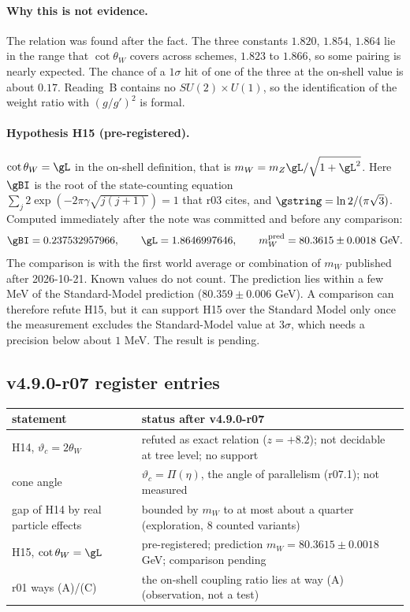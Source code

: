\paragraph{Why this is not evidence.}
The relation was found after the fact.  The three constants \(1.820\), \(1.854\), \(1.864\) lie in the range that
\(\cot\theta_W\) covers across schemes, \(1.823\) to \(1.866\), so some pairing is nearly expected.  The chance of a
\(1\sigma\) hit of one of the three at the on-shell value is about \(0.17\).  Reading~B contains no
\(SU(2)\times U(1)\), so the identification of the weight ratio with \((g/g')^2\) is formal.

\paragraph{Hypothesis H15 (pre-registered).}
\(\cot\theta_W=\gL\) in the on-shell definition, that is \(m_W=m_Z\gL/\sqrt{1+\gL^2}\).  Here \(\gBI\) is the root of the
state-counting equation \(\sum_{j}2\exp(-2\pi\gamma\sqrt{j(j+1)})=1\) that r03 cites, and \(\gstring=\ln2/(\pi\sqrt3)\).
Computed immediately after the note was committed and before any comparison:
\[
\gBI=0.237532957966,\qquad \gL=1.8646997646,\qquad m_W^{\rm pred}=80.3615\pm0.0018\ \text{GeV}.
\]
The comparison is with the first world average or combination of \(m_W\) published after 2026-10-21.  Known values do not
count.  The prediction lies within a few MeV of the Standard-Model prediction (\(80.359\pm0.006\) GeV).  A comparison can
therefore refute H15, but it can support H15 over the Standard Model only once the measurement excludes the
Standard-Model value at \(3\sigma\), which needs a precision below about \(1\) MeV.  The result is pending.

\subsection*{v4.9.0-r07 register entries}
\label{subsec:v490-r07-register}

\begin{center}
\small
\begin{tabular}{@{}>{\raggedright\arraybackslash}p{}>{\raggedright\arraybackslash}p{}@{}}
\toprule
statement & status after v4.9.0-r07\\
\midrule
H14, \(\vartheta_c=2\theta_W\) & refuted as exact relation (\(z=+8.2\)); not decidable at tree level; no support\\
cone angle & \(\vartheta_c=\Pi(\eta)\), the angle of parallelism (r07.1); not measured\\
gap of H14 by real particle effects & bounded by \(m_W\) to at most about a quarter (exploration, 8 counted variants)\\
H15, \(\cot\theta_W=\gL\) & pre-registered; prediction \(m_W=80.3615\pm0.0018\) GeV; comparison pending\\
r01 ways (A)/(C) & the on-shell coupling ratio lies at way (A) (observation, not a test)\\
\bottomrule
\end{tabular}
\end{center}

